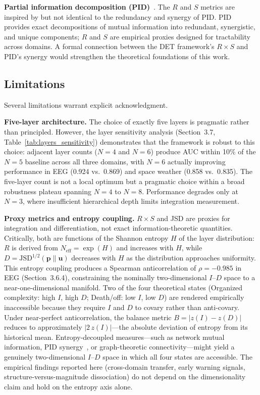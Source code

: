 \documentclass[12pt,a4paper]{article}
\begin{document}
\textbf{Partial information decomposition (PID)}~\cite{williams2010,aguilera2019,popiel2020}. The $R$ and $S$ metrics are inspired by but not identical to the redundancy and synergy of PID. PID provides exact decompositions of mutual information into redundant, synergistic, and unique components; $R$ and $S$ are empirical proxies designed for tractability across domains. A formal connection between the DET framework's $R \times S$ and PID's synergy would strengthen the theoretical foundations of this work.

\subsection{Limitations}

Several limitations warrant explicit acknowledgment.

\textbf{Five-layer architecture.} The choice of exactly five layers is pragmatic rather than principled. However, the layer sensitivity analysis (Section~3.7, Table~\ref{tab:layers_sensitivity}) demonstrates that the framework is robust to this choice: adjacent layer counts ($N = 4$ and $N = 6$) produce AUC within 10\% of the $N = 5$ baseline across all three domains, with $N = 6$ actually improving performance in EEG (0.924 vs.\ 0.869) and space weather (0.858 vs.\ 0.835). The five-layer count is not a local optimum but a pragmatic choice within a broad robustness plateau spanning $N = 4$ to $N = 8$. Performance degrades only at $N = 3$, where insufficient hierarchical depth limits integration measurement.

\textbf{Proxy metrics and entropy coupling.} $R \times S$ and JSD are proxies for integration and differentiation, not exact information-theoretic quantities. Critically, both are functions of the Shannon entropy $H$ of the layer distribution: $R$ is derived from $N_{\text{eff}} = \exp(H)$ and increases with $H$, while $D = \text{JSD}^{1/2}(\mathbf{p} \| \mathbf{u})$ decreases with $H$ as the distribution approaches uniformity. This entropy coupling produces a Spearman anticorrelation of $\rho = -0.985$ in EEG (Section~3.6.4), constraining the nominally two-dimensional $I$--$D$ space to a near-one-dimensional manifold. Two of the four theoretical states (Organized complexity: high $I$, high $D$; Death/off: low $I$, low $D$) are rendered empirically inaccessible because they require $I$ and $D$ to covary rather than anti-covary. Under near-perfect anticorrelation, the balance metric $B = |z(I) - z(D)|$ reduces to approximately $|2\,z(I)|$---the absolute deviation of entropy from its historical mean. Entropy-decoupled measures---such as network mutual information, PID synergy~\cite{williams2010}, or graph-theoretic connectivity---might yield a genuinely two-dimensional $I$--$D$ space in which all four states are accessible. The empirical findings reported here (cross-domain transfer, early warning signals, structure-versus-magnitude dissociation) do not depend on the dimensionality claim and hold on the entropy axis alone.
\end{document}
